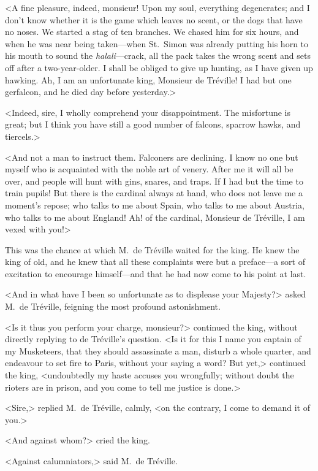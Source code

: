 <A fine pleasure, indeed, monsieur! Upon my soul, everything degenerates; and I don't know whether it is the game which leaves no scent, or the dogs that have no noses. We started a stag of ten branches. We chased him for six hours, and when he was near being taken—when St.~Simon was already putting his horn to his mouth to sound the \textit{halali}—crack, all the pack takes the wrong scent and sets off after a two-year-older. I shall be obliged to give up hunting, as I have given up hawking. Ah, I am an unfortunate king, Monsieur de Tréville! I had but one gerfalcon, and he died day before yesterday.> 

<Indeed, sire, I wholly comprehend your disappointment. The misfortune is great; but I think you have still a good number of falcons, sparrow hawks, and tiercels.> 

<And not a man to instruct them. Falconers are declining. I know no one but myself who is acquainted with the noble art of venery. After me it will all be over, and people will hunt with gins, snares, and traps. If I had but the time to train pupils! But there is the cardinal always at hand, who does not leave me a moment's repose; who talks to me about Spain, who talks to me about Austria, who talks to me about England! Ah!  of the cardinal, Monsieur de Tréville, I am vexed with you!> 

This was the chance at which M.~de Tréville waited for the king. He knew the king of old, and he knew that all these complaints were but a preface—a sort of excitation to encourage himself—and that he had now come to his point at last. 

<And in what have I been so unfortunate as to displease your Majesty?> asked M.~de Tréville, feigning the most profound astonishment. 

<Is it thus you perform your charge, monsieur?> continued the king, without directly replying to de Tréville's question. <Is it for this I name you captain of my Musketeers, that they should assassinate a man, disturb a whole quarter, and endeavour to set fire to Paris, without your saying a word? But yet,> continued the king, <undoubtedly my haste accuses you wrongfully; without doubt the rioters are in prison, and you come to tell me justice is done.> 

<Sire,> replied M.~de Tréville, calmly, <on the contrary, I come to demand it of you.> 

<And against whom?> cried the king. 

<Against calumniators,> said M.~de Tréville. 

